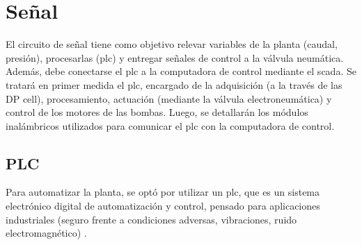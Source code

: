 \section{Señal}
\label{sec:Senal}

El circuito de señal tiene como objetivo relevar variables de la planta (caudal,
presión), procesarlas (\gls{plc}) y entregar señales de control a la válvula
neumática. Además, debe conectarse el \gls{plc} a la computadora de control
mediante el \gls{scada}.
Se tratará en primer medida el \gls{plc}, encargado de la adquisición (a 
la través de las DP cell), procesamiento, actuación (mediante la válvula 
electroneumática) y control de los motores de las bombas. Luego, se detallarán 
los módulos inalámbricos utilizados para comunicar el \gls{plc} con la 
computadora de control.

\subsection{PLC}
\label{subsec:plc}

Para automatizar la planta, se optó por utilizar un \gls{plc}, que es 
un sistema electrónico digital de automatización y control, pensado para 
aplicaciones industriales (seguro frente a condiciones adversas, vibraciones, 
ruido electromagnético) \cite{bib:ApuntesJGabriel}.

